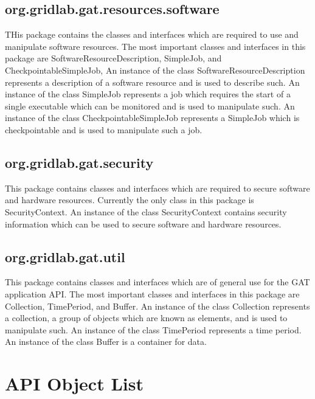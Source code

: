 \documentclass[$Date: 2003/06/26 19:29:31 $]{glabarticle}
\begin{document}
\subsection{org.gridlab.gat.resources.software}

THis package contains the classes and interfaces which are required to use and manipulate software
resources. The most important classes and interfaces in this package are SoftwareResourceDescription,
SimpleJob, and CheckpointableSimpleJob, An instance of the class SoftwareResourceDescription represents
a description of a software resource and is used to describe such. An instance of the class SimpleJob
represents a job which requires the start of a single executable which can be monitored and is used
to manipulate such. An instance of the class CheckpointableSimpleJob represents a SimpleJob
which is checkpointable and is used to manipulate such a job.

\subsection{org.gridlab.gat.security}

This package contains classes and interfaces which are required to secure software and hardware resources.
Currently the only class in this package is SecurityContext. An instance of the class SecurityContext contains
security information which can be used to secure software and hardware resources. 

\subsection{org.gridlab.gat.util}

This package contains classes and interfaces which are of general use for the GAT application API. The
most important classes and interfaces in this package are Collection, TimePeriod, and Buffer. An instance
of the class Collection represents a collection, a group of objects which are known as elements, and is used
to manipulate such. An instance of the class TimePeriod represents a time period. An instance of the
class Buffer is a container for data.


\newpage

\section{API Object List}
\label{sec:API-Olist}
\end{document}
